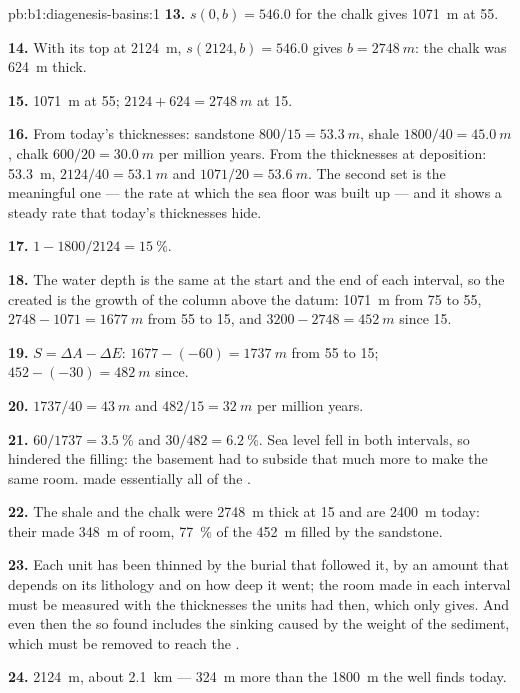 \begin{solution}{pb:b1:diagenesis-basins:1}
\textbf{13.} $s(0, b) = 546.0$ for the chalk gives \qty{1071}{m} at
\qty{55}{\Ma}.

\textbf{14.} With its top at \qty{2124}{m}, $s(2124, b) = 546.0$ gives $b =
\qty{2748}{m}$: the chalk was \qty{624}{m} thick.

\textbf{15.} \qty{1071}{m} at \qty{55}{\Ma}; $2124 + 624 = \qty{2748}{m}$ at
\qty{15}{\Ma}.

\textbf{16.} From today's thicknesses: sandstone $800/15 = \qty{53.3}{m}$,
shale $1800/40 = \qty{45.0}{m}$, chalk $600/20 = \qty{30.0}{m}$ per million
years. From the thicknesses at deposition: \qty{53.3}{m}, $2124/40 =
\qty{53.1}{m}$ and $1071/20 = \qty{53.6}{m}$. The second set is the meaningful
one --- the rate at which the sea floor was built up --- and it shows a steady
rate that today's thicknesses hide.

\textbf{17.} $1 - 1800/2124 = \qty{15}{\%}$.

\textbf{18.} The water depth is the same at the start and the end of each
interval, so the  created is the growth of the column above the
datum: \qty{1071}{m} from 75 to \qty{55}{\Ma}, $2748 - 1071 = \qty{1677}{m}$ from
55 to \qty{15}{\Ma}, and $3200 - 2748 = \qty{452}{m}$ since \qty{15}{\Ma}.

\textbf{19.} $S = \Delta A - \Delta E$: $1677 - (-60) = \qty{1737}{m}$ from 55 to
\qty{15}{\Ma}; $452 - (-30) = \qty{482}{m}$ since.

\textbf{20.} $1737/40 = \qty{43}{m}$ and $482/15 = \qty{32}{m}$ per million
years.

\textbf{21.} $60/1737 = \qty{3.5}{\%}$ and $30/482 = \qty{6.2}{\%}$. Sea level fell
in both intervals, so  hindered the filling: the basement had to subside
that much more to make the same room.  made essentially all of the
.

\textbf{22.} The shale and the chalk were \qty{2748}{m} thick at \qty{15}{\Ma}
and are \qty{2400}{m} today: their  made \qty{348}{m} of room,
\qty{77}{\%} of the \qty{452}{m} filled by the sandstone.

\textbf{23.} Each unit has been thinned by the burial that followed it, by an
amount that depends on its lithology and on how deep it went; the room made in
each interval must be measured with the thicknesses the units had then, which
only  gives. And even then the  so found includes the
sinking caused by the weight of the sediment, which must be removed to reach the
.

\textbf{24.} \qty{2124}{m}, about \qty{2.1}{km} --- \qty{324}{m} more than the
\qty{1800}{m} the well finds today.
\end{solution}
